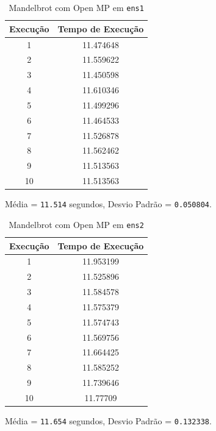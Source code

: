 \documentclass[10pt,a4paper]{article}
\begin{document}
		\begin{table}[htb]
			\centering
			\begin{tabular}{|c|c|}
				\hline
				Execução & Tempo de Execução\\ \hline
				1  & 11.474648 \\ \hline
				2  & 11.559622 \\ \hline
				3  & 11.450598 \\ \hline
				4  & 11.610346 \\ \hline
				5  & 11.499296 \\ \hline
				6  & 11.464533 \\ \hline
				7  & 11.526878 \\ \hline
				8  & 11.562462 \\ \hline
				9  & 11.513563 \\ \hline
				10 & 11.513563 \\ \hline
			\end{tabular}
			\caption{Mandelbrot com Open MP em \texttt{ens1}}
		\end{table}
		Média = \texttt{11.514} segundos, Desvio Padrão = \texttt{0.050804}.

		\begin{table}[htb]
			\centering
			\begin{tabular}{|c|c|}
				\hline
				Execução & Tempo de Execução\\ \hline
				1  & 11.953199 \\ \hline
				2  & 11.525896 \\ \hline
				3  & 11.584578 \\ \hline
				4  & 11.575379 \\ \hline
				5  & 11.574743 \\ \hline
				6  & 11.569756 \\ \hline
				7  & 11.664425 \\ \hline
				8  & 11.585252 \\ \hline
				9  & 11.739646 \\ \hline
				10 & 11.77709 \\ \hline
			\end{tabular}
			\caption{Mandelbrot com Open MP em \texttt{ens2}}
		\end{table}
		Média = \texttt{11.654} segundos, Desvio Padrão = \texttt{0.132338}.
\end{document}
